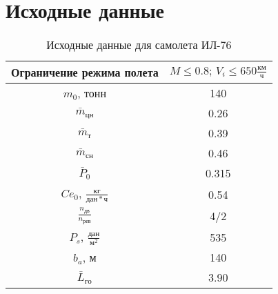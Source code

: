 \chapter{Исходные данные}

\begin{table}[H]
    \centering
    \caption{Исходные данные для самолета ИЛ-76}
    \label{tab:variant_data}
    \begin{tabular}{|c|c|}
        \hline
        Ограничение режима полета & $M \le 0.8; \, V_i \le 650 \frac{км}{ч}$\\
        \hline
        $m_0$, тонн & 140 \\ 
        \hline
        $\bar{m}_{цн}$ & 0.26\\ 
        \hline
        $\bar{m}_т$ & 0.39\\ 
        \hline
        $\bar{m}_{сн}$ & 0.46\\ 
        \hline
        $\bar{P}_0$ & 0.315\\ 
        \hline
        $Ce_0$, $\frac{кг}{дан \ast ч}$ & 0.54\\ 
        \hline
        $\frac{n_{дв}}{n_{рев}}$ & 4/2 \\ 
        \hline
        $P_s$, $\frac{дан}{м^2}$& 535 \\ 
        \hline
        $b_a$, м& 140 \\ 
        \hline
        $\bar{L}_{го}$ & 3.90 \\ 
        \hline
    \end{tabular}
\end{table}

